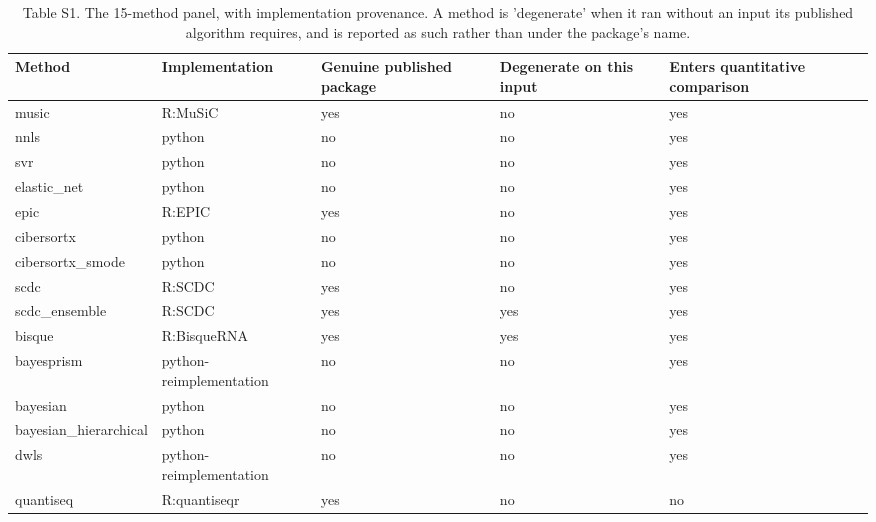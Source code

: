 \begin{table}[htbp]
\centering
\small
\caption{Table S1. The 15-method panel, with implementation provenance. A method is 'degenerate' when it ran without an input its published algorithm requires, and is reported as such rather than under the package's name.}
\label{tab:S1_method_roster}
\begin{tabular}{lllll}
\toprule
\textbf{Method} & \textbf{Implementation} & \textbf{Genuine published package} & \textbf{Degenerate on this input} & \textbf{Enters quantitative comparison} \\
\midrule
music & R:MuSiC & yes & no & yes \\
nnls & python & no & no & yes \\
svr & python & no & no & yes \\
elastic\_net & python & no & no & yes \\
epic & R:EPIC & yes & no & yes \\
cibersortx & python & no & no & yes \\
cibersortx\_smode & python & no & no & yes \\
scdc & R:SCDC & yes & no & yes \\
scdc\_ensemble & R:SCDC & yes & yes & yes \\
bisque & R:BisqueRNA & yes & yes & yes \\
bayesprism & python-reimplementation & no & no & yes \\
bayesian & python & no & no & yes \\
bayesian\_hierarchical & python & no & no & yes \\
dwls & python-reimplementation & no & no & yes \\
quantiseq & R:quantiseqr & yes & no & no \\
\bottomrule
\end{tabular}
\end{table}

